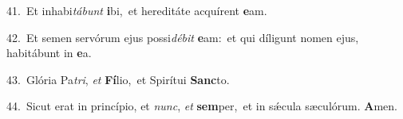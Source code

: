 {\numbfont\textcolor{\numbcolor}{41.}}~Et inhabi\-\textit{tá}\-\textit{bunt} \textbf{i}\-bi,~\star et hereditáte acquírent \textbf{e}\-am.\par
{\numbfont\textcolor{\numbcolor}{42.}}~Et semen servórum ejus possi\-\textit{dé}\-\textit{bit} \textbf{e}\-am:~\star et qui díligunt nomen ejus, habitábunt in \textbf{e}\-a.\par
{\numbfont\textcolor{\numbcolor}{43.}}~Glória Pa\-\textit{tri}\-, \textit{et} \textbf{Fí}\-lio,~\star et Spirítui \textbf{Sanc}\-to.\par
{\numbfont\textcolor{\numbcolor}{44.}}~Sicut erat in princípio, et \textit{nunc}\-, \textit{et} \textbf{sem}\-per,~\star et in sǽcula sæculórum. \textbf{A}\-men.\par

